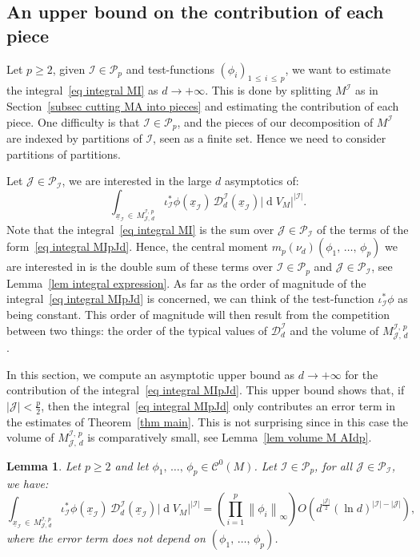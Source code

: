 \documentclass[10pt]{amsart}
\newtheorem{lemm}[theo]{Lemma}\newtheorem{prop}[theo]{Proposition}\newtheorem{coro}[theo]{Corollary}\newtheorem{conj}[theo]{Conjecture}
\theoremstyle{definition}\newtheorem{defi}[theo]{Definition}\newtheorem{rema}[theo]{Remark}\newtheorem{exam}[theo]{Example}\newtheorem{exem}[theo]{Example}\newtheorem{nota}[theo]{Notation}
\DeclareMathOperator{\dmesure}{d}
\newcommand{\D}{\mathcal{D}}
\newcommand{\I}{\mathcal{I}}
\newcommand{\J}{\mathcal{J}}
\newcommand{\clC}{\mathcal{C}}
\newcommand{\pa}{\mathcal{P}\!}
\newcommand{\norm}[1]{\left\lvert #1 \right\rvert}
\newcommand{\Norm}[1]{\left\lVert #1 \right\rVert}
\newcommand{\rmes}[1]{\norm{\dmesure\! V_{#1}}}
\renewcommand{\geq}{\geqslant}
\renewcommand{\leq}{\leqslant}
\begin{document}
\subsection{An upper bound on the contribution of each piece}\label{subsec an upper bound on the contribution of each piece}

Let $p \geq 2$, given $\I \in \pa_p$ and test-functions $(\phi_i)_{1\,\leq\,i\,\leq\,p}$, we want to estimate the integral~\eqref{eq integral MI} as $d \to +\infty$. This is done by splitting $M^\I$ as in Section~\ref{subsec cutting MA into pieces} and estimating the contribution of each piece. One difficulty is that $\I \in \pa_p$, and the pieces of our decomposition of $M^\I$ are indexed by partitions of $\I$, seen as a finite set. Hence we need to consider partitions of partitions.

Let $\J \in \pa_\I$, we are interested in the large $d$ asymptotics of:
\begin{equation}\label{eq integral MIpJd}
\int_{\underline{x}_\I\,\in\,M^{\I,\,p}_{\J,\,d}} \iota_\I^*\phi\left(\underline{x}_\I\right)\, \D^\I_d\left(\underline{x}_\I\right) \rmes{M}^{\norm{\I}}.
\end{equation}
Note that the integral~\eqref{eq integral MI} is the sum over $\J \in \pa_\I$ of the terms of the form~\eqref{eq integral MIpJd}. Hence, the central moment $m_p(\nu_d)(\phi_1,\,\dots,\,\phi_p)$ we are interested in is the double sum of these terms over $\I \in \pa_p$ and $\J \in \pa_\I$, see Lemma~\ref{lem integral expression}. As far as the order of magnitude of the integral~\eqref{eq integral MIpJd} is concerned, we can think of the test-function $\iota_\I^*\phi$ as being constant. This order of magnitude will then result from the competition between two things: the order of the typical values of $\D_d^\I$ and the volume of $M^{\I,\,p}_{\J,\,d}$.

In this section, we compute an asymptotic upper bound as $d \to +\infty$ for the contribution of the integral~\eqref{eq integral MIpJd}. This upper bound shows that, if $|\J| < \frac{p}{2}$, then the integral~\eqref{eq integral MIpJd} only contributes an error term in the estimates of Theorem~\ref{thm main}. This is not surprising since in this case the volume of $M^{\I,\,p}_{\J,\,d}$ is comparatively small, see Lemma~\ref{lem volume M AIdp}.

\begin{lemm}\label{lem upper bound}
Let $p \geq 2$ and let $\phi_1,\,\dots,\,\phi_p \in \clC^0(M)$. Let $\I \in \pa_p$, for all $\J \in \pa_\I$, we have:
\[
\int_{\underline{x}_\I\,\in\,M^{\I,\,p}_{\J,\,d}} \iota_\I^*\phi\left(\underline{x}_\I\right)\, \D^\I_d\left(\underline{x}_\I\right) \rmes{M}^{\norm{\I}} = \left(\prod_{i=1}^p \Norm{\phi_i}_\infty\right) O\!\left(d^{\frac{\norm{\J}}{2}} (\ln d)^{\norm{\I}-\norm{\J}}\right),
\]
where the error term does not depend on $(\phi_1,\,\dots,\,\phi_p)$.
\end{lemm}
\end{document}
